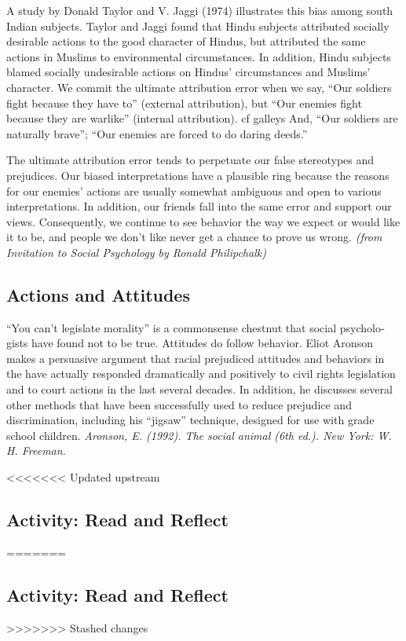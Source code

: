 \documentclass[
]{book}
\begin{document}
A study by Donald Taylor and V. Jaggi (1974) illustrates this bias among south Indian subjects. Taylor and Jaggi found that Hindu subjects attributed socially desirable actions to the good character of Hindus, but attributed the same actions in Muslims to environmental circumstances. In addition, Hindu subjects blamed socially undesirable actions on Hindus' circumstances and Muslims' character. We commit the ultimate attribution error when we say, ``Our soldiers fight because they have to'' (external attribution), but ``Our enemies fight because they are warlike'' (internal attribution). cf galleys And, ``Our soldiers are naturally brave''; ``Our enemies are forced to do daring deeds.''

The ultimate attribution error tends to perpetuate our false stereotypes and prejudices. Our biased interpretations have a plausible ring because the reasons for our enemies' actions are usually somewhat ambiguous and open to various interpretations. In addition, our friends fall into the same error and support our views. Consequently, we continue to see behavior the way we expect or would like it to be, and people we don't like never get a chance to prove us wrong. \emph{(from Invitation to Social Psychology by Ronald Philipchalk)}

\hypertarget{actions-and-attitudes}{%
\subsection*{Actions and Attitudes}\label{actions-and-attitudes}}

``You can't legislate morality'' is a commonsense chestnut that social psycholo­gists have found not to be true. Attitudes do follow behavior. Eliot Aronson makes a persuasive argument that racial prejudiced attitudes and behaviors in the have actually responded dramatically and positively to civil rights legisla­tion and to court actions in the last several decades. In addition, he discusses sev­eral other methods that have been successfully used to reduce prejudice and discrimination, including his ``jigsaw'' technique, designed for use with grade school children. \emph{Aronson, E. (1992). The social animal (6th ed.). New York: W. H. Freeman.}

<<<<<<< Updated upstream
\hypertarget{activity-read-and-reflect-5}{%
\subsection*{Activity: Read and Reflect}\label{activity-read-and-reflect-5}}
=======
\hypertarget{activity-read-and-reflect-4}{%
\subsection*{Activity: Read and Reflect}\label{activity-read-and-reflect-4}}
>>>>>>> Stashed changes
\end{document}
